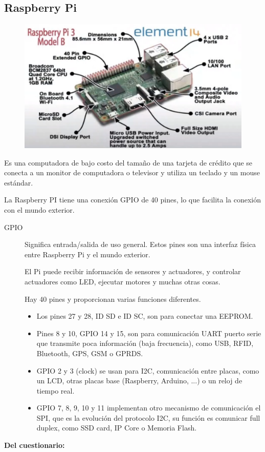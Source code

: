 \documentclass[12pt, twoside, openright]{report} %
\begin{document}
\subsection{Raspberry Pi}

\begin{figure}[H]
	{\includegraphics[scale=.4]{2021-03-19 17_48_46-DSO Elementos Sistema embebido.mkv.png}}
\end{figure}

Es una computadora de bajo costo del tamaño de una tarjeta de crédito que se conecta a un monitor de computadora o televisor y utiliza un teclado y un mouse estándar.

La Raspberry PI tiene una conexión GPIO de 40 pines, lo que facilita la conexión con el mundo exterior.


\begin{description}
	\item[GPIO] Significa entrada/salida de uso general. Estos pines son una interfaz física entre Raspberry Pi y el mundo exterior.

	      El Pi puede recibir información de sensores y actuadores, y controlar actuadores como LED, ejecutar motores y muchas otras cosas.

	      Hay 40 pines y proporcionan varias funciones diferentes.
	      \begin{itemize}
		      \item Los pines 27 y 28, ID SD e ID SC, son para conectar una EEPROM.
		      \item Pines 8 y 10, GPIO 14 y 15, son para comunicación UART puerto serie que transmite poca información (baja frecuencia), como USB, RFID, Bluetooth, GPS, GSM o GPRDS.
		      \item GPIO 2 y 3 (clock) se usan para I2C, comunicación entre placas, como un LCD, otras placas base (Raspberry, Arduino, ...) o un reloj de tiempo real.
		      \item GPIO 7, 8, 9, 10 y 11 implementan otro mecanismo de comunicación el SPI, que es la evolución del protocolo I2C, su función es comunicar full duplex, como SSD card, IP Core o Memoria Flash.
	      \end{itemize}

\end{description}
\textbf{Del cuestionario:}
\end{document}
